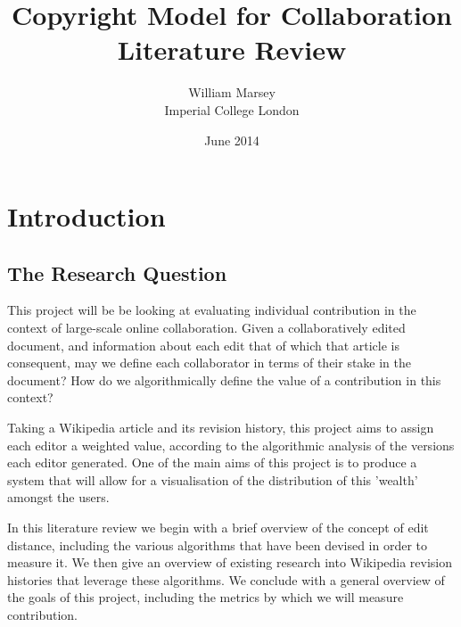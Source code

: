 \documentclass[a4paper,11pt,twoside,notitlepage]{article}
\begin{document}
	\title{Copyright Model for Collaboration
		\\ \small Literature Review}
	\author{William Marsey
		\\Imperial College London}
	\date{June 2014}
 	\maketitle	
        
        \tableofcontents

        \clearpage

        \section{Introduction}
        \subsection{The Research Question}
        This project will be be looking at evaluating individual
        contribution in the context of large-scale online
        collaboration. Given a collaboratively edited document, and information about
        each edit that of which that article is consequent, may we
        define each collaborator in terms of their stake in the
        document? How do we algorithmically define the value of a
        contribution in this context? 

        Taking a Wikipedia article and its revision history, this
        project aims to assign each editor a weighted value, according
        to the algorithmic analysis of the versions each editor
        generated. One of the main aims of this project is to produce
        a system that will allow for a visualisation of the
        distribution of this 'wealth' amongst the users.   
        
        In this literature review we begin with a brief overview of
        the concept of edit distance, including the various algorithms
        that have been devised in order to measure it. We then give an
        overview of existing research into Wikipedia revision
        histories that leverage these algorithms. We conclude with a
        general overview of the goals of this project, including the
        metrics by which we will measure contribution.
\end{document}
